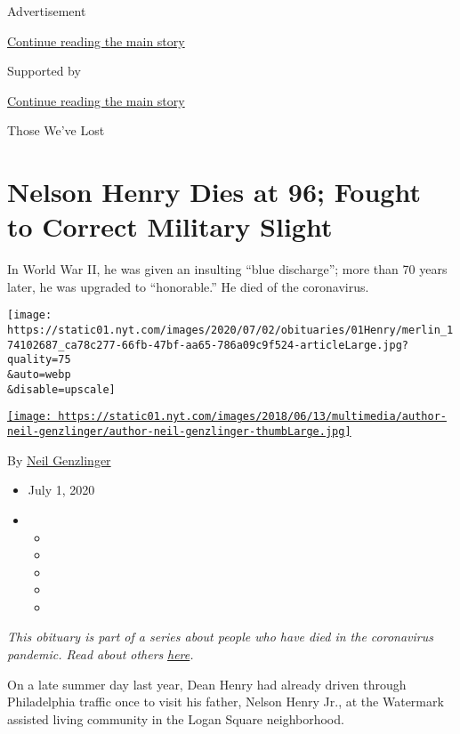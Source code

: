 Advertisement

\protect\hyperlink{after-top}{Continue reading the main story}

Supported by

\protect\hyperlink{after-sponsor}{Continue reading the main story}

Those We've Lost

\hypertarget{nelson-henry-dies-at-96-fought-to-correct-military-slight}{%
\section{Nelson Henry Dies at 96; Fought to Correct Military
Slight}\label{nelson-henry-dies-at-96-fought-to-correct-military-slight}}

In World War II, he was given an insulting ``blue discharge''; more than
70 years later, he was upgraded to ``honorable.'' He died of the
coronavirus.

\texttt{[image: https://static01.nyt.com/images/2020/07/02/obituaries/01Henry/merlin\_174102687\_ca78c277-66fb-47bf-aa65-786a09c9f524-articleLarge.jpg?quality=75\\\&auto=webp\\\&disable=upscale]}

\href{https://www.nytimes.com/by/neil-genzlinger}{\texttt{[image: https://static01.nyt.com/images/2018/06/13/multimedia/author-neil-genzlinger/author-neil-genzlinger-thumbLarge.jpg]}}

By \href{https://www.nytimes.com/by/neil-genzlinger}{Neil Genzlinger}

\begin{itemize}
\item
  July 1, 2020
\item
  \begin{itemize}
  \item
  \item
  \item
  \item
  \item
  \end{itemize}
\end{itemize}

\emph{This obituary is part of a series about people who have died in
the coronavirus pandemic. Read about others}
\href{https://www.nytimes.com/interactive/2020/obituaries/people-died-coronavirus-obituaries.html}{\emph{here}}\emph{.}

On a late summer day last year, Dean Henry had already driven through
Philadelphia traffic once to visit his father, Nelson Henry Jr., at the
Watermark assisted living community in the Logan Square neighborhood.

